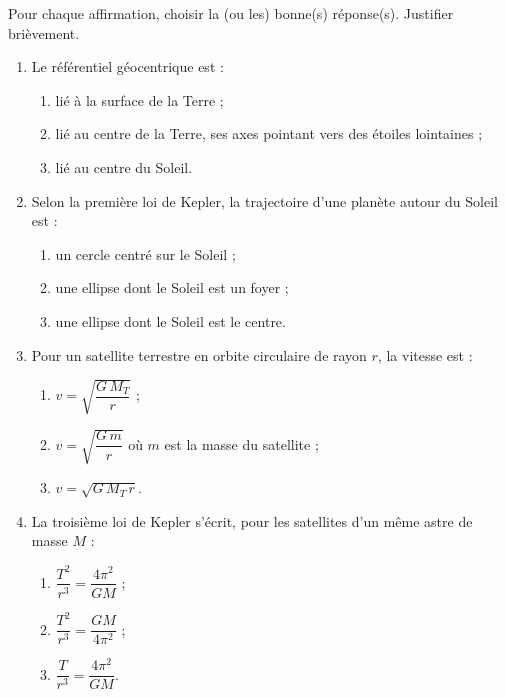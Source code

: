 \documentclass[11pt]{article}
\begin{document}
\begin{exercice}
Pour chaque affirmation, choisir la (ou les) bonne(s) réponse(s). Justifier brièvement.
\begin{enumerate}
\item Le référentiel géocentrique est :
\begin{enumerate}
\item lié à la surface de la Terre ;
\item lié au centre de la Terre, ses axes pointant vers des étoiles lointaines ;
\item lié au centre du Soleil.
\end{enumerate}
\item Selon la première loi de Kepler, la trajectoire d'une planète autour du Soleil est :
\begin{enumerate}
\item un cercle centré sur le Soleil ;
\item une ellipse dont le Soleil est un foyer ;
\item une ellipse dont le Soleil est le centre.
\end{enumerate}
\item Pour un satellite terrestre en orbite circulaire de rayon $r$, la vitesse est :
\begin{enumerate}
\item $v = \sqrt{\dfrac{G\,M_T}{r}}$ ;
\item $v = \sqrt{\dfrac{G\,m}{r}}$ où $m$ est la masse du satellite ;
\item $v = \sqrt{G\,M_T\,r}$.
\end{enumerate}
\item La troisième loi de Kepler s'écrit, pour les satellites d'un même astre de masse $M$ :
\begin{enumerate}
\item $\dfrac{T^2}{r^3} = \dfrac{4\pi^2}{GM}$ ;
\item $\dfrac{T^2}{r^3} = \dfrac{GM}{4\pi^2}$ ;
\item $\dfrac{T}{r^3} = \dfrac{4\pi^2}{GM}$.
\end{enumerate}
\end{enumerate}
\end{exercice}
\end{document}

